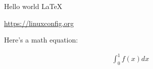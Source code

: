 \documentclass{article}
\begin{document}
Hello world \LaTeX

\url{https://linuxconfig.org}

Here's a math equation:

\begin{align}
    \int_0^1 f(x)dx
\end{align}
\end{document}
